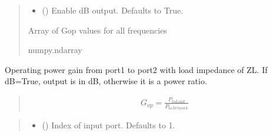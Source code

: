 \documentclass[letterpaper,10pt,english]{sphinxmanual}
\begin{document}
\begin{fulllineitems}
\begin{fulllineitems}
\begin{quote}
\begin{description}
\begin{itemize}
\item {}
\sphinxAtStartPar
{} (\sphinxstyleliteralemphasis{\sphinxupquote{, }}) \textendash{} Enable dB output. Defaults to True.

\end{itemize}

\sphinxAtStartPar
Array of Gop values for all frequencies

\sphinxAtStartPar
numpy.ndarray

\end{description}\end{quote}

\end{fulllineitems}


\begin{fulllineitems}
\label{\detokenize{touchstone:touchstone.spfile.gop2}}
\pysigstartsignatures
{}
\pysigstopsignatures
\sphinxAtStartPar
Operating power gain from port1 to port2 with load impedance of ZL. If dB=True, output is in dB, otherwise it is a power ratio.
\begin{quote}
\begin{equation*}
\begin{split}G_{op}=\frac{P_{toLoad}}{P_{toNetwork}}\end{split}
\end{equation*}\end{quote}
\begin{quote}\begin{description}
\begin{itemize}
\item {}
\sphinxAtStartPar
{} (\sphinxstyleliteralemphasis{\sphinxupquote{, }}) \textendash{} Index of input port. Defaults to 1.


\end{itemize}
\end{description}
\end{quote}
\end{fulllineitems}
\end{fulllineitems}
\end{document}
